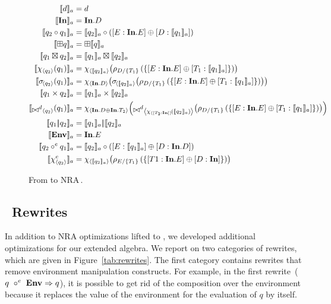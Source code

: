 \begin{figure*}[ht]
  \centering
\begin{align*}
\etoa{d}&=d\\
\etoa{\qID}&= \qID.D\\
\etoa{q_2 \circ q_1}&= \etoa{q_2} \circ ([E:\qID.E] \opconcat [D:\etoa{q_1}])\\
\etoa{\opunop q}&= \opunop \etoa{q}\\
\etoa{q_1 \opbinop q_2}&= \etoa{q_1} \opbinop \etoa{q_2}\\
\etoa{\qmap{q_2}{q_1}}&= \qmap{\etoa{q_2}}{\quntwo{T_1}{D}{ \{ [E:\qID.E] \opconcat [T_1:\etoa{q_1}] \} } }\\
\etoa{\qselect{q_2}{q_1}}&= \qmap{ \qID.D }{\qselect{\etoa{q_2}}{\quntwo{T_1}{D}{ \{ [E:\qID.E] \opconcat [T_1:\etoa{q_1}] \} } } }\\
\etoa{q_1 \times q_2}&= \etoa{q_1} \times \etoa{q_2}\\
\etoa{\qdjoin{q_2}{q_1}}&= \qmap{ \qID.D \opconcat \qID.T_2 }{\qdjoin{\qmap{[T_2:\qID]}{\etoa{q_2}}}{\quntwo{T_1}{D}{ \{ [E:\qID.E] \opconcat [T_1:\etoa{q_1}] \} } } }\\
\etoa{q_1 \qor q_2}&=\etoa{q_1} \qor \etoa{q_2}\\
\etoa{\qENV}&= \qID.E\\
\etoa{q_2 \circ^e q_1}&= \etoa{q_2} \circ ([E:\etoa{q_1}] \opconcat [D:\qID.D])\\
\etoa{\qmapenv{q_2}}&= \qmap{\etoa{q_2}}{\quntwo{T_1}{E}{ \{
                           [T1:\qID.E] \opconcat [D:\qID] \} } }
\end{align*}
  \caption{From \NRAEnv to NRA\,. \qquad {}}
  \label{fig:nraenvtonra}
\end{figure*}

\subsection{\NRAEnv\ Rewrites}
\label{sec:nraenv:rewrites}

In addition to NRA optimizations lifted to \NRAEnv, we developed
additional optimizations for our extended algebra. We report on two
categories of rewrites, which are given in Figure~\ref{tab:rewrites}.
%
The first category contains rewrites that remove environment
manipulation constructs.
%
For example, in the first rewrite~($q\ \circ^e\ \qENV \Rightarrow q$),
it is possible to get rid of the composition over the environment
because it replaces the value of the environment for the evaluation of
$q$ by itself.

